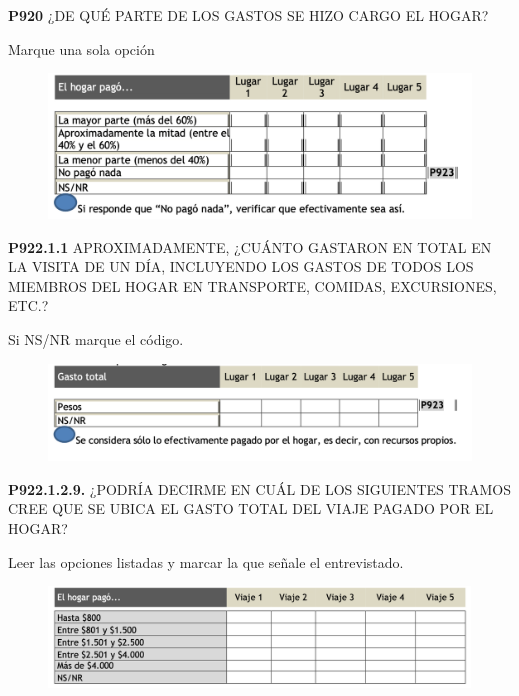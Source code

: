 \documentclass[
  openany]{book}
\begin{document}
\textbf{P920} ¿DE QUÉ PARTE DE LOS GASTOS SE HIZO CARGO EL HOGAR?

Marque una sola opción

\begin{figure}

{\centering \includegraphics[width=1\linewidth]{imagenes/figura6-295} 

}

\end{figure}

\textbf{P922.1.1} APROXIMADAMENTE, ¿CUÁNTO GASTARON EN TOTAL EN LA VISITA DE UN DÍA, INCLUYENDO LOS GASTOS DE TODOS LOS MIEMBROS DEL HOGAR EN TRANSPORTE, COMIDAS, EXCURSIONES, ETC.?

Si NS/NR marque el código.

\begin{figure}

{\centering \includegraphics[width=1\linewidth]{imagenes/figura6-296} 

}

\end{figure}

\textbf{P922.1.2.9.} ¿PODRÍA DECIRME EN CUÁL DE LOS SIGUIENTES TRAMOS CREE QUE SE UBICA EL GASTO TOTAL DEL VIAJE PAGADO POR EL HOGAR?

Leer las opciones listadas y marcar la que señale el entrevistado.

\begin{figure}

{\centering \includegraphics[width=1\linewidth]{imagenes/figura6-297} 

}

\end{figure}
\end{document}
